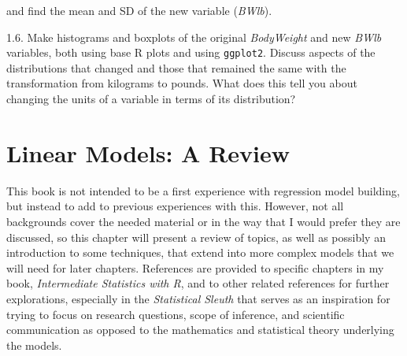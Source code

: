 \documentclass[
]{book}
\begin{document}
and find the mean and SD of the new variable (\emph{BWlb}).

1.6. Make histograms and boxplots of
the original \emph{BodyWeight} and new \emph{BWlb} variables, both using base R plots and
using \texttt{ggplot2}. Discuss aspects of the
distributions that changed and those that remained the same with the
transformation from kilograms to pounds. What does this tell you about changing
the units of a variable in terms of its distribution?

\hypertarget{chapter2}{%
\chapter{Linear Models: A Review}\label{chapter2}}

This book is not intended to be a first experience with regression model building, but instead to add to previous experiences with this. However, not all backgrounds cover the needed material or in the way that I would prefer they are discussed, so this chapter will present a review of topics, as well as possibly an introduction to some techniques, that extend into more complex models that we will need for later chapters. References are provided to specific chapters in my book, \emph{Intermediate Statistics with R}, and to other related references for further explorations, especially in the \emph{Statistical Sleuth} that serves as an inspiration for trying to focus on research questions, scope of inference, and scientific communication as opposed to the mathematics and statistical theory underlying the models.
\end{document}
